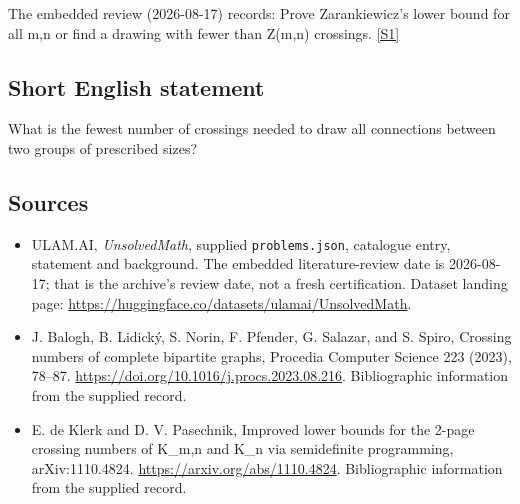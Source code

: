 \documentclass[11pt,a4paper]{article}
\newcommand{\sref}[2]{\hyperlink{source:#1:#2}{[S#2]}}
\begin{document}
The embedded review (2026-08-17) records: Prove Zarankiewicz's lower bound for all m,n or find a drawing with fewer than Z(m,n) crossings. \sref{statement}{1}

\subsection{Short English statement}

What is the fewest number of crossings needed to draw all connections between two groups of prescribed sizes?

\subsection{Sources}

{\small

\begin{itemize}

\item[\hypertarget{source:statement:1}{S1}] ULAM.AI, \emph{UnsolvedMath}, supplied \texttt{problems.json}, catalogue entry, statement and background. The embedded literature-review date is 2026-08-17; that is the archive’s review date, not a fresh certification. Dataset landing page: \url{https://huggingface.co/datasets/ulamai/UnsolvedMath}.

\item[\hypertarget{source:statement:2}{S2}] J. Balogh, B. Lidický, S. Norin, F. Pfender, G. Salazar, and S. Spiro, Crossing numbers of complete bipartite graphs, Procedia Computer Science 223 (2023), 78–87. \url{https://doi.org/10.1016/j.procs.2023.08.216}. Bibliographic information from the supplied record.

\item[\hypertarget{source:statement:3}{S3}] E. de Klerk and D. V. Pasechnik, Improved lower bounds for the 2-page crossing numbers of K\_{m,n} and K\_n via semidefinite programming, arXiv:1110.4824. \url{https://arxiv.org/abs/1110.4824}. Bibliographic information from the supplied record.

\end{itemize}

}

\label{end:statement}
\end{document}
